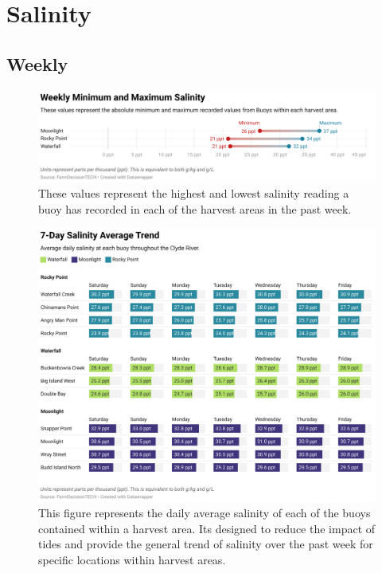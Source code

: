\documentclass[10pt]{article}
\begin{document}
\pagebreak

\tableofcontents

\listoffigures

\pagebreak

\section{Salinity}
\subsection{Weekly}

\begin{figure}[H]
\centering
\includegraphics[width=\textwidth]{weekly-salinity-extremes.png}
\caption[Weekly Minimum and Maximum Salinity]{These values represent the highest and lowest salinity reading a buoy has recorded in each of the harvest areas in the past week.}
\end{figure}

\begin{figure}[H]
\centering
\includegraphics[width=\textwidth]{weekly-salinity.png}
\caption[Average Weekly Salinity Table]{This figure represents the daily average salinity of each of the buoys contained within a harvest area. Its designed to reduce the impact of tides and provide the general trend of salinity over the past week for specific locations within harvest areas.}
\end{figure}
\end{document}
